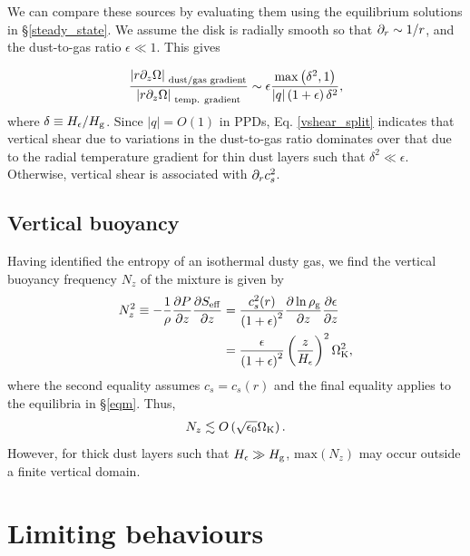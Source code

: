 We can compare these sources by 
evaluating them using the equilibrium
solutions in \S\ref{steady_state}. We assume the disk is radially
smooth so that $\partial_r\sim 1/r$, and the dust-to-gas ratio
$\epsilon\ll1$. This gives 

\begin{align}\label{vshear_split}
  \frac{\left|r\partial_z\Omega\right|_{\text{
        dust/gas gradient}}}{\left|r\partial_z\Omega\right|_{\text{
        temp. gradient}}} \sim
 \epsilon \frac{\mathrm{max}\left(\delta^2,
    1\right)}{\left|q\right|\left(1+\epsilon\right)\delta^2},
\end{align}
where $\delta\equiv H_\epsilon/H_\mathrm{g}$. 
Since $|q|=O(1)$ in PPDs, Eq. \ref{vshear_split} indicates that
vertical shear due to variations in the dust-to-gas ratio dominates 
over that due to the radial temperature gradient for thin dust layers
such that $\delta^2\ll \epsilon$. Otherwise, vertical shear is
associated with $\partial_rc_s^2$.  

\subsection{Vertical buoyancy}\label{vbuoyancy}
Having identified the entropy of an isothermal dusty gas, we find the
vertical buoyancy frequency $N_z$ of the mixture is given by 
\begin{align}
  N_z^2 \equiv - \frac{1}{\rho}\frac{\partial P}{\partial z}\frac{\partial S_\mathrm{eff}}{\partial z} &=
  \frac{c_s^2(r)}{\left(1+\epsilon\right)^2}\frac{\partial\ln\rho_\mathrm{g}}{\partial 
  z}\frac{\partial\epsilon}{\partial z} \\ &
                                  =
  \frac{\epsilon}{\left(1+\epsilon\right)^2}\left(\frac{z}{H_\epsilon}\right)^2\Omega_{\rm K}^2\notag,  
\end{align}
where the second equality assumes $c_s=c_s(r)$ and the final equality
applies to the equilibria in \S\ref{eqm}. Thus,  
\begin{align*}
N_z\lesssim
O\left(\sqrt{\epsilon_0}\Omega_{\rm K}\right). 
\end{align*}
However, for thick dust layers such that $H_\epsilon \gg H_\mathrm{g}$, 
$\mathrm{max}\left(N_z\right)$ may occur outside a finite vertical domain.  



\section{Limiting behaviours}\label{limits}

